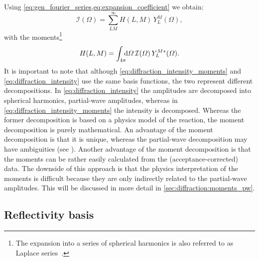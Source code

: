 Using \cref{eq:gen_fourier_series,eq:expansion_coefficient} we obtain:
\begin{equation}
  \label{eq:diffraction_intensity_moments}
  \mathcal{I}(\Omega)
  = \sum_{L M}^\infty H(L, M)\, Y_L^M(\Omega),
\end{equation}
with the moments\footnote{The expansion into a series of spherical
harmonics is also referred to as Laplace
series~\cite{MathWorld:LaplaceSeries}.}
\begin{equation}
  \label{eq:diffraction_moments}
  H(L, M)
  = \int_{4 \pi}\!\!\! \dif{\Omega}\, \mathcal{I}(\Omega)\, Y_L^{M *}(\Omega).
\end{equation}
It is important to note that although
\cref{eq:diffraction_intensity_moments} and
\cref{eq:diffraction_intensity} use the same basis functions, the two
represent different decompositions.  In
\cref{eq:diffraction_intensity} the amplitudes are decomposed into
spherical harmonics, \ie partial-wave amplitudes, whereas in
\cref{eq:diffraction_intensity_moments} the intensity is decomposed.
Whereas the former decomposition is based on a physics model of the
reaction, the moment decomposition is purely mathematical.  An
advantage of the moment decomposition is that it is unique, whereas
the partial-wave decomposition may have ambiguities (see \eg
{}).  Another advantage of the moment
decomposition is that the moments can be rather easily calculated from
the (acceptance-corrected) data.  The downside of this approach is
that the physics interpretation of the moments is difficult because
they are only indirectly related to the partial-wave amplitudes.  This
will be discussed in more detail in \cref{sec:diffraction:moments_pw}.


\subsection{Reflectivity basis}%
\label{sec:diffraction:reflectivity}

